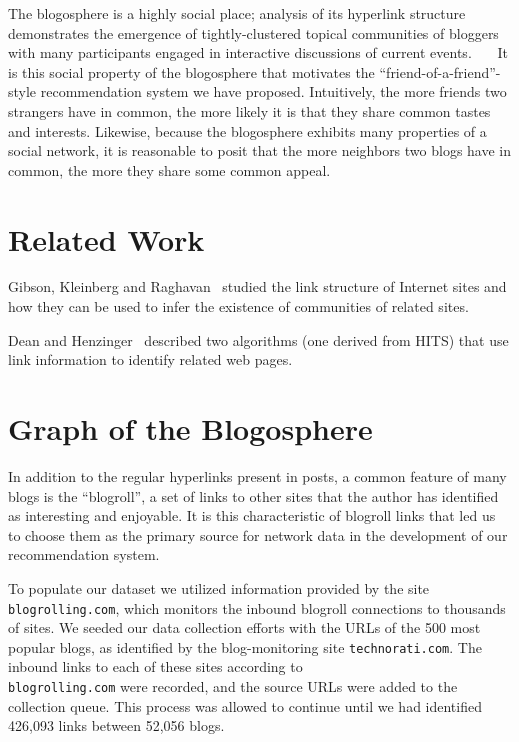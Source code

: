 \documentclass{sig-alternate}
\begin{document}
%
The blogosphere is a highly social place; analysis of its
hyperlink structure demonstrates the emergence of tightly-clustered
topical communities of bloggers with many participants engaged in
interactive discussions of current events.~\cite{adamic}~\cite{convBlog}~\cite{commBlog} It is this social property
of the blogosphere that motivates the
``friend-of-a-friend''-style recommendation system we
have proposed. Intuitively, the more friends two strangers have in
common, the more likely it is that they share common tastes and
interests.  Likewise, because the blogosphere exhibits many properties
of a social network, it is reasonable to posit that the more neighbors
two blogs have in common, the more they share some common appeal.

\section{Related Work}

Gibson, Kleinberg and Raghavan~\cite{gibson1998iwc} studied the link
structure of Internet sites and how they can be used to infer the
existence of communities of related sites.

Dean and Henzinger~\cite{dean1999frp} described two algorithms (one
derived from HITS) that use link information to identify related web
pages.

\section{Graph of the Blogosphere}
In addition to the regular hyperlinks present in posts, a common
feature of many blogs is the ``blogroll'', a set of
links to other sites that the author has identified as interesting and
enjoyable.  It is this characteristic of blogroll links
that led us to choose them as the primary source for network data in
the development of our recommendation system.

To populate our dataset we utilized information provided by the site
\texttt{blogrolling.com}, which monitors the inbound blogroll
connections to thousands of sites.  We seeded our data collection
efforts with the URLs of the 500 most popular blogs, as identified by
the blog-monitoring site  \texttt{technorati.com}.  The inbound links to each of
these sites according to \\ \texttt{blogrolling.com} were recorded, and the source
URLs were added to the collection queue.  This process was allowed to
continue until we had identified 426,093 links between 52,056 blogs.
\end{document}
